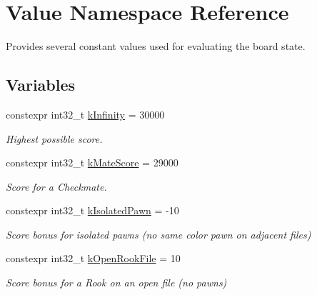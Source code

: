 \hypertarget{namespaceValue}{}\section{Value Namespace Reference}
\label{namespaceValue}


Provides several constant values used for evaluating the board state.  


\subsection*{Variables}
\begin{DoxyCompactItemize}
\item 
\mbox{\label{namespaceValue_aed547988abe75be2e24c74f02fd9ddb9}} 
constexpr int32\+\_\+t \mbox{\hyperlink{namespaceValue_aed547988abe75be2e24c74f02fd9ddb9}{k\+Infinity}} = 30000
\begin{DoxyCompactList}\small\item\em Highest possible score. \end{DoxyCompactList}\item 
\mbox{\label{namespaceValue_a88d993145245aca4baa932c1dbc7fd92}} 
constexpr int32\+\_\+t \mbox{\hyperlink{namespaceValue_a88d993145245aca4baa932c1dbc7fd92}{k\+Mate\+Score}} = 29000
\begin{DoxyCompactList}\small\item\em Score for a Checkmate. \end{DoxyCompactList}\item 
\mbox{\label{namespaceValue_a354b47d5941b61c2a883ba36823e4c98}} 
constexpr int32\+\_\+t \mbox{\hyperlink{namespaceValue_a354b47d5941b61c2a883ba36823e4c98}{k\+Isolated\+Pawn}} = -\/10
\begin{DoxyCompactList}\small\item\em Score bonus for isolated pawns (no same color pawn on adjacent files) \end{DoxyCompactList}\item 
\mbox{\label{namespaceValue_adaecf503d96c902ebae1588565e5c3e1}} 
constexpr int32\+\_\+t \mbox{\hyperlink{namespaceValue_adaecf503d96c902ebae1588565e5c3e1}{k\+Open\+Rook\+File}} = 10
\begin{DoxyCompactList}\small\item\em Score bonus for a Rook on an open file (no pawns) \end{DoxyCompactList}\item 

\end{DoxyCompactItemize}
